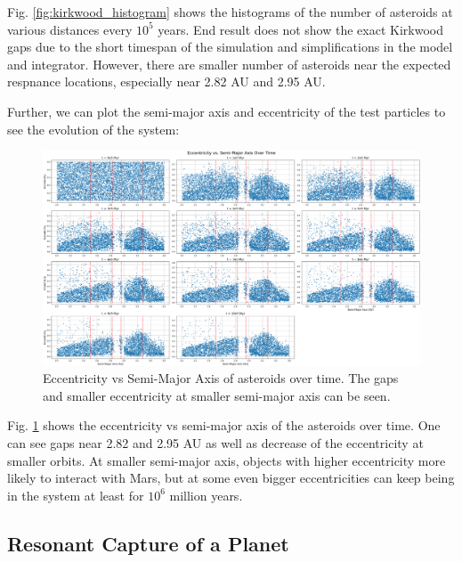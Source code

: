 \documentclass[12pt,a4paper]{article}
\begin{document}
Fig. \ref{fig:kirkwood_histogram} shows the histograms of the number of asteroids at various distances every $10^5$ years.
End result does not show the exact Kirkwood gaps due to the short timespan of the simulation and simplifications in the model and integrator. However, there are smaller number of asteroids near the expected respnance locations, especially near 2.82 AU and 2.95 AU.

Further, we can plot the semi-major axis and eccentricity of the test particles to see the evolution of the system:

\begin{figure}[ht]
  \centering
  \includegraphics[width=\linewidth]{kirkwood/a_e_kirkwood.png}
  \caption{Eccentricity vs Semi-Major Axis of asteroids over time. The gaps and smaller eccentricity at smaller semi-major axis can be seen.}
  \label{fig:kirkwood_a_e}
\end{figure}

Fig. \ref{fig:kirkwood_a_e} shows the eccentricity vs semi-major axis of the asteroids over time. One can see gaps near 2.82 and 2.95 AU as well as decrease of the eccentricity at smaller orbits.
At smaller semi-major axis, objects with higher eccentricity more likely to interact with Mars, but at some even bigger eccentricities can keep being in the system at least for $10^6$ million years.

\subsection{Resonant Capture of a Planet}
\end{document}
